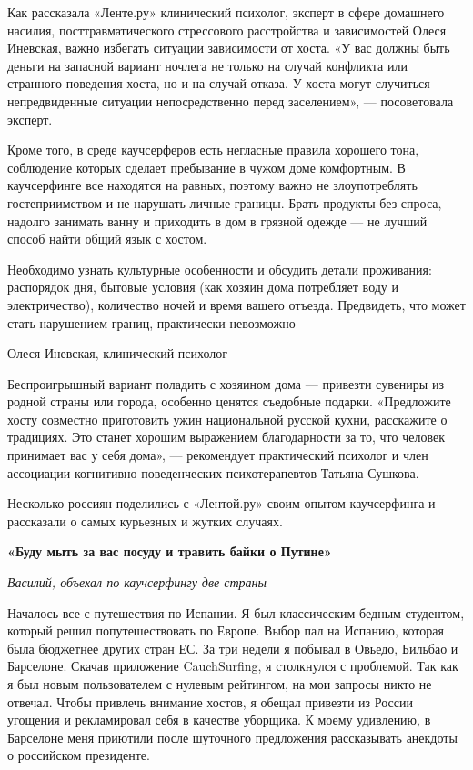 Как рассказала «Ленте.ру» клинический психолог, эксперт в сфере домашнего насилия, посттравматического стрессового расстройства и зависимостей Олеся Иневская, важно избегать ситуации зависимости от хоста. «У вас должны быть деньги на запасной вариант ночлега не только на случай конфликта или странного поведения хоста, но и на случай отказа. У хоста могут случиться непредвиденные ситуации непосредственно перед заселением», — посоветовала эксперт.

Кроме того, в среде каучсерферов есть негласные правила хорошего тона, соблюдение которых сделает пребывание в чужом доме комфортным. В каучсерфинге все находятся на равных, поэтому важно не злоупотреблять гостеприимством и не нарушать личные границы. Брать продукты без спроса, надолго занимать ванну и приходить в дом в грязной одежде — не лучший способ найти общий язык с хостом.

\begin{fancyquotes}
    Необходимо узнать культурные особенности и обсудить детали проживания: распорядок дня, бытовые условия (как хозяин дома потребляет воду и электричество), количество ночей и время вашего отъезда. Предвидеть, что может стать нарушением границ, практически невозможно

    \begin{flushright}
        Олеся Иневская, клинический психолог
    \end{flushright}
\end{fancyquotes}

Беспроигрышный вариант поладить с хозяином дома — привезти сувениры из родной страны или города, особенно ценятся съедобные подарки. «Предложите хосту совместно приготовить ужин национальной русской кухни, расскажите о традициях. Это станет хорошим выражением благодарности за то, что человек принимает вас у себя дома», — рекомендует практический психолог и член ассоциации когнитивно-поведенческих психотерапевтов Татьяна Сушкова.

Несколько россиян поделились с «Лентой.ру» своим опытом каучсерфинга и рассказали о самых курьезных и жутких случаях.

\textbf{«Буду мыть за вас посуду и травить байки о Путине»}

\textit{Василий, объехал по каучсерфингу две страны}

Началось все с путешествия по Испании. Я был классическим бедным студентом, который решил попутешествовать по Европе. Выбор пал на Испанию, которая была бюджетнее других стран ЕС. За три недели я побывал в Овьедо, Бильбао и Барселоне. Скачав приложение CauchSurfing, я столкнулся с проблемой. Так как я был новым пользователем с нулевым рейтингом, на мои запросы никто не отвечал. Чтобы привлечь внимание хостов, я обещал привезти из России угощения и рекламировал себя в качестве уборщика. К моему удивлению, в Барселоне меня приютили после шуточного предложения рассказывать анекдоты о российском президенте.

